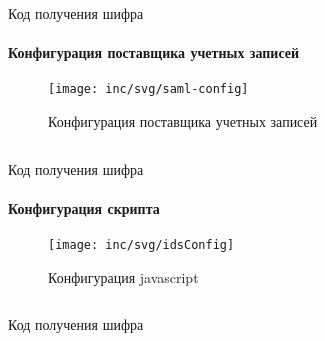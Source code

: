 \begin{listing}[H]
\inputminted[linenos,frame=single]{java}{inc/src/samlProviderConfiguration}
\caption{Код получения шифра} 
\label{lst:samlProviderConfiguration}
\end{listing}

\paragraph{Конфигурация поставщика учетных записей}

\begin{figure}[H]
  \centering
  \texttt{[image: inc/svg/saml-config]}
  \caption{Конфигурация поставщика учетных записей}
  \label{fig:samlConfig}
\end{figure}

\begin{listing}[H]
\inputminted[linenos,frame=single]{java}{inc/src/samlConfiguration}
\caption{Код получения шифра} 
\label{lst:samlConfiguration}
\end{listing}

\paragraph{Конфигурация скрипта}

\begin{figure}[H]
  \centering
  \texttt{[image: inc/svg/idsConfig]}
  \caption{Конфигурация javascript}
  \label{fig:idsConfig}
\end{figure}

\begin{listing}[H]
\inputminted[linenos,frame=single]{java}{inc/src/idsConfiguration}
\caption{Код получения шифра} 
\label{lst:idsConfiguration}
\end{listing}


